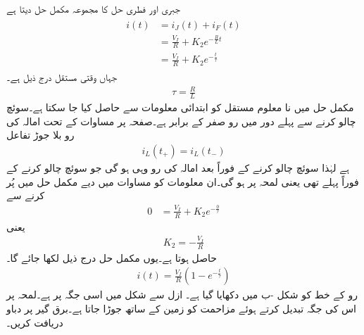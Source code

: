 جبری اور فطری حل کا مجموعہ مکمل حل دیتا ہے
\begin{gather}
\begin{aligned}\label{مساوات_عارضی_مزاحمت_امالہ_مکمل_حل_الف}
i(t)&=i_J(t)+i_F(t)\\
&=\frac{V_I}{R}+K_2e^{-\frac{R}{L}t}\\
&=\frac{V_I}{R}+K_2e^{-\frac{t}{\tau}}
\end{aligned}
\end{gather}
جہاں وقتی مستقل درج ذیل ہے۔
\begin{align}
\tau=\frac{R}{L}
\end{align}
مکمل حل میں نا معلوم مستقل  کو ابتدائی معلومات سے حاصل کیا جا سکتا ہے۔سوئچ چالو کرنے سے پہلے دور میں رو صفر کے برابر ہے۔صفحہ  پر مساوات  کے تحت امالہ کی رو بلا جوڑ تفاعل
\begin{align*}
i_L(t_+)=i_L(t_-)
\end{align*} 
ہے لہٰذا سوئچ چالو کرنے کے فوراً بعد امالہ کی رو وہی ہو گی جو سوئچ چالو کرنے کے فوراً پہلے تھی یعنی لمحہ  پر  ہو گی۔ان معلومات کو مساوات  میں دیے مکمل حل میں پُر کرنے سے
\begin{align*}
0&=\frac{V_I}{R}+K_2e^{-\frac{0}{\tau}}
\end{align*}
یعنی
\begin{align*}
K_2=-\frac{V_I}{R}
\end{align*}
حاصل ہوتا ہے۔یوں مکمل حل درج ذیل لکھا جائے گا۔
\begin{align}
i(t)=\frac{V_I}{R} \left(1-e^{-\frac{t}{\tau}}\right)
\end{align}
رو کے خط کو شکل -ب میں دکھایا گیا ہے۔
ازل سے شکل  میں  اسی جگہ پر ہے۔لمحہ  پر اس کی جگہ تبدیل کرتے ہوئے  مزاحمت کو زمین کے ساتھ جوڑا جاتا ہے۔برق گیر پر دباو دریافت کریں۔
